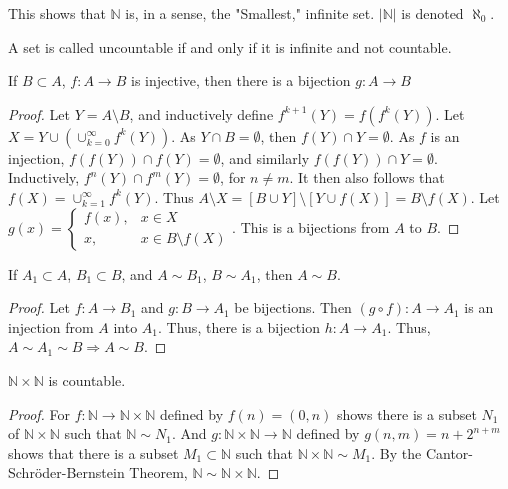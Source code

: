         This shows that $\mathbb{N}$ is, in a sense, the "Smallest,"
        infinite set. $|\mathbb{N}|$ is denoted $\aleph_0$.
        \begin{definition}
        A set is called uncountable if and only if it is infinite and not countable.
        \end{definition}
        \begin{theorem}
            If $B\subset A$, $f:A\rightarrow B$ is injective, then there
            is a bijection $g:A\rightarrow B$
        \end{theorem}
        \begin{proof}
            Let $Y = A\setminus B$, and inductively define
            $f^{k+1}(Y)=f(f^{k}(Y))$. Let
            $X=Y\cup(\cup_{k=0}^{\infty}f^{k}(Y))$. As  $Y\cap{B}=\emptyset$,
            then $f(Y)\cap Y= \emptyset$. As $f$ is an injection,
            $f(f(Y))\cap f(Y)=\emptyset$,
            and similarly $f(f(Y))\cap Y = \emptyset$. Inductively,
            $f^{n}(Y)\cap f^{m}(Y)=\emptyset$,
        for $n\ne m$. It then also follows that $f(X) = \cup_{k=1}^{\infty} f^{k}(Y)$.
        Thus $A\setminus X = [B\cup Y]\setminus [Y\cup f(X)] = B\setminus f(X)$.
        Let $g(x) = \begin{cases} f(x), & x\in X \\ x, & x \in B\setminus f(X)\end{cases}$.
        This is a bijections from $A$ to $B$.
        \end{proof}
        \begin{theorem}
        If $A_1 \subset A$, $B_1 \subset B$, and $A\sim B_1$, $B \sim A_1$, then $A\sim B$.
        \end{theorem}
        \begin{proof}
        Let $f:A\rightarrow B_1$ and $g:B\rightarrow A_1$ be bijections.
        Then $(g\circ f):A\rightarrow A_1$ is an injection from $A$ into $A_1$.
        Thus, there is a bijection $h:A\rightarrow A_1$. Thus, $A\sim A_1 \sim B\Rightarrow A\sim B$.
        \end{proof}
        \begin{theorem}
            $\mathbb{N}\times \mathbb{N}$ is countable.
        \end{theorem}
        \begin{proof}
        For $f:\mathbb{N} \rightarrow \mathbb{N}\times \mathbb{N}$ defined by $f(n) = (0,n)$
        shows there is a subset $N_1$ of $\mathbb{N} \times \mathbb{N}$ such that
        $\mathbb{N}\sim N_1$. And $g:\mathbb{N}\times \mathbb{N} \rightarrow \mathbb{N}$
        defined by $g(n,m) =n+2^{n+m}$ shows that there is a subset $M_1 \subset \mathbb{N}$
        such that $\mathbb{N} \times \mathbb{N} \sim M_1$. By the Cantor-Schr\"{o}der-Bernstein Theorem,
        $\mathbb{N} \sim \mathbb{N}\times \mathbb{N}$.
        \end{proof}

